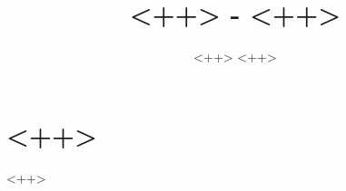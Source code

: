 \documentclass[a4paper, norsk, 12pt, final]{article}
\begin{document}
\title{<++> - <++>}
\author{<++> \hspace{0.2in} <++>}
\maketitle
\newpage
{}
\section{<++>}

<++>
\end{document}
